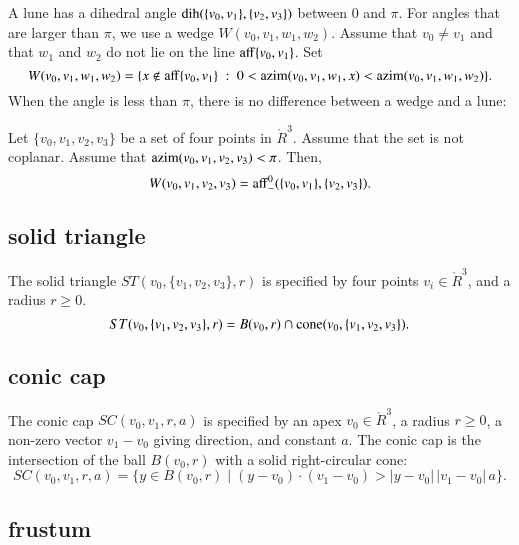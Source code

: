 A lune has a dihedral angle $\operatorname{dih}(\{v_0,v_1\},\{v_2,v_3\})$ between
$0$ and $\pi$.   For angles that are larger than $\pi$,  we use a wedge
$W(v_0,v_1,w_1,w_2)$.  Assume that $v_0\ne v_1$ and that
$w_1$ and $w_2$ do not lie on
the line ${\operatorname{aff}}\{v_0,v_1\}$.  Set
$$
W(v_0,v_1,w_1,w_2) = 
  \{x\not\in{\operatorname{aff}}\{v_0,v_1\} \ :\  
  0< {\operatorname{azim}}(v_0,v_1,w_1,x) < {\operatorname{azim}}(v_0,v_1,w_1,w_2)\}.
$$
When the angle is less than $\pi$, there is no difference between
a wedge and a lune:

\begin{lemma} Let $\{v_0,v_1,v_2,v_3\}$ be a set of four points
in $\ring{R}^3$.  Assume that the set is not coplanar.
Assume that ${\operatorname{azim}}(v_0,v_1,v_2,v_3)<\pi$.
Then,
   $$W(v_0,v_1,v_2,v_3) = {\operatorname{aff}}^0_-(\{v_0,v_1\},\{v_2,v_3\}).$$
\end{lemma}


\subsection{solid triangle}

\begin{definition} The solid triangle $ST(v_0,\{v_1,v_2,v_3\},r)$ is
specified by four points $v_i\in\ring{R}^3$, and a radius $r\ge0$. 
    $$
    ST(v_0,\{v_1,v_2,v_3\},r) = 
    B(v_0,r)\cap {\operatorname{cone}}(v_0,\{v_1,v_2,v_3\}).
    $$
\end{definition}



\subsection{conic cap}


\begin{definition}
The conic cap $SC(v_0,v_1,r,a)$ is specified by an apex
$v_0\in\ring{R}^3$, a radius $r\ge0$, a non-zero vector $v_1-v_0$ giving
direction, and constant $a$.  The conic cap is the intersection of
the ball $B(v_0,r)$ with a solid right-circular cone:
    $$
    SC(v_0,v_1,r,a)=\{y \in B(v_0,r) \mid (y-v_0)\cdot (v_1-v_0) > |y-v_0|\, |v_1-v_0|\, a\}.
    $$
\end{definition}

\subsection{frustum}


